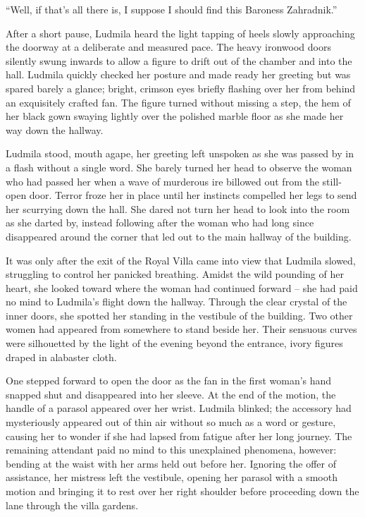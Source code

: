 “Well, if that’s all there is, I suppose I should find this Baroness Zahradnik.”

 

After a short pause, Ludmila heard the light tapping of heels slowly approaching the doorway at a deliberate and measured pace. The heavy ironwood doors silently swung inwards to allow a figure to drift out of the chamber and into the hall. Ludmila quickly checked her posture and made ready her greeting but was spared barely a glance; bright, crimson eyes briefly flashing over her from behind an exquisitely crafted fan. The figure turned without missing a step, the hem of her black gown swaying lightly over the polished marble floor as she made her way down the hallway.

 

Ludmila stood, mouth agape, her greeting left unspoken as she was passed by in a flash without a single word. She barely turned her head to observe the woman who had passed her when a wave of murderous ire billowed out from the still-open door. Terror froze her in place until her instincts compelled her legs to send her scurrying down the hall. She dared not turn her head to look into the room as she darted by, instead following after the woman who had long since disappeared around the corner that led out to the main hallway of the building.

 

It was only after the exit of the Royal Villa came into view that Ludmila slowed, struggling to control her panicked breathing. Amidst the wild pounding of her heart, she looked toward where the woman had continued forward – she had paid no mind to Ludmila’s flight down the hallway. Through the clear crystal of the inner doors, she spotted her standing in the vestibule of the building. Two other women had appeared from somewhere to stand beside her. Their sensuous curves were silhouetted by the light of the evening beyond the entrance, ivory figures draped in alabaster cloth.

 

One stepped forward to open the door as the fan in the first woman’s hand snapped shut and disappeared into her sleeve. At the end of the motion, the handle of a parasol appeared over her wrist. Ludmila blinked; the accessory had mysteriously appeared out of thin air without so much as a word or gesture, causing her to wonder if she had lapsed from fatigue after her long journey. The remaining attendant paid no mind to this unexplained phenomena, however: bending at the waist with her arms held out before her. Ignoring the offer of assistance, her mistress left the vestibule, opening her parasol with a smooth motion and bringing it to rest over her right shoulder before proceeding down the lane through the villa gardens.

